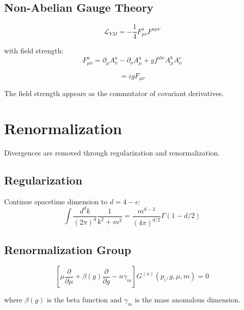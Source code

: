\subsection{Non-Abelian Gauge Theory}

\begin{definition}
\label{def:yang-mills}
\begin{equation}
\mathcal{L}_{YM} = -\frac{1}{4}F_{\mu\nu}^a F^{a\mu\nu}
\end{equation}

with field strength:
\begin{equation}
F_{\mu\nu}^a = \partial_\mu A_\nu^a - \partial_\nu A_\mu^a + gf^{abc}A_\mu^b A_\nu^c
\end{equation}
\end{definition}

\begin{proposition}
\label{prop:non-abelian}
\begin{equation}
[D_\mu, D_\nu] = igF_{\mu\nu}
\end{equation}

The field strength appears as the commutator of covariant derivatives.
\end{proposition}

\section{Renormalization}

Divergences are removed through regularization and renormalization.

\subsection{Regularization}

\begin{definition}
\label{def:dim-reg}
Continue spacetime dimension to $d = 4 - \epsilon$:
\begin{equation}
\int \frac{d^dk}{(2\pi)^d} \frac{1}{k^2 + m^2} = \frac{m^{d-2}}{(4\pi)^{d/2}} \Gamma(1-d/2)
\end{equation}
\end{definition}

\subsection{Renormalization Group}

\begin{theorem}[RG Equation]
\label{thm:rg}
\begin{equation}
\left[\mu\frac{\partial}{\partial\mu} + \beta(g)\frac{\partial}{\partial g} - n\gamma_m\right] G^{(n)}(p_i,g,\mu,m) = 0
\end{equation}

where $\beta(g)$ is the beta function and $\gamma_m$ is the mass anomalous dimension.
\end{theorem}

